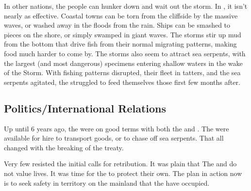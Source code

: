 \documentclass[blue]{GL2020}
\begin{document}
In other nations, the people can hunker down and wait out the storm. In \pShip{}, it isn't nearly as effective. Coastal towns can be torn from the cliffside by the massive waves, or washed away in the floods from the rain. Ships can be smashed to pieces on the shore, or simply swamped in giant waves. The storms stir up mud from the bottom that drive fish from their normal migrating patterns, making food much harder to come by. The storms also seem to attract sea serpents, with the largest (and most dangerous) specimens entering shallow waters in the wake of the Storm. With fishing patterns disrupted, their fleet in tatters, and the sea serpents agitated, the \pShip{} struggled to feed themselves those first few months after.




\subsection*{Politics/International Relations}
Up until 6 years ago, the \pShip{} were on good terms with both the \pFarm{} and \pTech{}. The \pShippies{} were available for hire to transport goods, or to chase off sea serpents. That all changed with the breaking of the treaty. 

Very few \pShippies{} resisted the initial calls for retribution. It was plain that The \pFarm{} and \pTech{} do not value \pShip{} lives. It was time for the \pShipppies{} to protect their own. The plan in action now is to seek safety in territory on the mainland that the \pShip{} have occupied.
\end{document}
